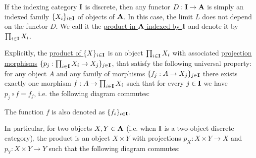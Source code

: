 \begin{definition}\label{def:categorical_product}\cite[definition 5.1.1, 5.1.7]{Leinster2014}
  If the indexing category $\operatorname{\mathbf{I}}$ is discrete, then any functor $D: \operatorname{\mathbf{I}} \to \operatorname{\mathbf{A}}$ is simply an indexed family $\{ X_i \}_{i \in \operatorname{\mathbf{I}}}$ of objects of $\operatorname{\mathbf{A}}$. In this case, the limit $L$ does not depend on the functor $D$. We call it the \uline{product in $\operatorname{\mathbf{A}}$ indexed by $\operatorname{\mathbf{I}}$} and denote it by $\prod_{i \in \operatorname{\mathbf{I}}} X_i$.

  Explicitly, the \uline{product of $\{ X \}_{i \in \operatorname{\mathbf{I}}}$} is an object $\prod_{i \in \operatorname{\mathbf{I}}} X_i$ with associated \uline{projection morphisms} $\{ p_j: \prod_{i \in \operatorname{\mathbf{I}}} X_i \to X_j \}_{j \in \operatorname{\mathbf{I}}}$, that satisfy the following universal property: for any object $A$ and any family of morphisms $\{ f_j: A \to {X_j} \}_{j \in \operatorname{\mathbf{I}}}$ there exists exactly one morphism $f: A \to \prod_{i \in \operatorname{\mathbf{I}}} X_i$ such that for every $j \in \operatorname{\mathbf{I}}$ we have $p_j \circ f = f_j$, i.e. the following diagram commutes:
  \begin{center}
  \end{center}

  The function $f$ is also denoted as $\{ f_i \}_{i \in \operatorname{\mathbf{I}}}$.

  In particular, for two objects $X, Y \in \operatorname{\mathbf{A}}$ (i.e. when $\operatorname{\mathbf{I}}$ is a two-object discrete category), the product is an object $X \times Y$ with projections $p_X: X \times Y \to X$ and $p_Y: X \times Y \to Y$ such that the following diagram commutes:
  \begin{center}
  \end{center}
\end{definition}

